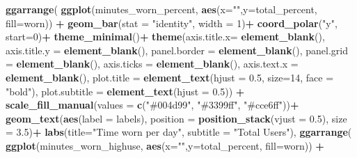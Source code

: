 \documentclass[
]{article}
\newenvironment{Shaded}{\begin{snugshade}}{\end{snugshade}}
\newcommand{\AttributeTok}[1]{\textcolor[rgb]{0.13,0.29,0.53}{#1}}
\newcommand{\DecValTok}[1]{\textcolor[rgb]{0.00,0.00,0.81}{#1}}
\newcommand{\FloatTok}[1]{\textcolor[rgb]{0.00,0.00,0.81}{#1}}
\newcommand{\FunctionTok}[1]{\textcolor[rgb]{0.13,0.29,0.53}{\textbf{#1}}}
\newcommand{\NormalTok}[1]{#1}
\newcommand{\SpecialCharTok}[1]{\textcolor[rgb]{0.81,0.36,0.00}{\textbf{#1}}}
\newcommand{\StringTok}[1]{\textcolor[rgb]{0.31,0.60,0.02}{#1}}
\begin{document}
\begin{Shaded}
\begin{Highlighting}[]
\FunctionTok{ggarrange}\NormalTok{(}
  \FunctionTok{ggplot}\NormalTok{(minutes\_worn\_percent, }\FunctionTok{aes}\NormalTok{(}\AttributeTok{x=}\StringTok{""}\NormalTok{,}\AttributeTok{y=}\NormalTok{total\_percent, }\AttributeTok{fill=}\NormalTok{worn)) }\SpecialCharTok{+}
  \FunctionTok{geom\_bar}\NormalTok{(}\AttributeTok{stat =} \StringTok{"identity"}\NormalTok{, }\AttributeTok{width =} \DecValTok{1}\NormalTok{)}\SpecialCharTok{+}
  \FunctionTok{coord\_polar}\NormalTok{(}\StringTok{"y"}\NormalTok{, }\AttributeTok{start=}\DecValTok{0}\NormalTok{)}\SpecialCharTok{+}
  \FunctionTok{theme\_minimal}\NormalTok{()}\SpecialCharTok{+}
  \FunctionTok{theme}\NormalTok{(}\AttributeTok{axis.title.x=} \FunctionTok{element\_blank}\NormalTok{(),}
        \AttributeTok{axis.title.y =} \FunctionTok{element\_blank}\NormalTok{(),}
        \AttributeTok{panel.border =} \FunctionTok{element\_blank}\NormalTok{(), }
        \AttributeTok{panel.grid =} \FunctionTok{element\_blank}\NormalTok{(), }
        \AttributeTok{axis.ticks =} \FunctionTok{element\_blank}\NormalTok{(),}
        \AttributeTok{axis.text.x =} \FunctionTok{element\_blank}\NormalTok{(),}
        \AttributeTok{plot.title =} \FunctionTok{element\_text}\NormalTok{(}\AttributeTok{hjust =} \FloatTok{0.5}\NormalTok{, }\AttributeTok{size=}\DecValTok{14}\NormalTok{, }\AttributeTok{face =} \StringTok{"bold"}\NormalTok{),}
        \AttributeTok{plot.subtitle =} \FunctionTok{element\_text}\NormalTok{(}\AttributeTok{hjust =} \FloatTok{0.5}\NormalTok{)) }\SpecialCharTok{+}
    \FunctionTok{scale\_fill\_manual}\NormalTok{(}\AttributeTok{values =} \FunctionTok{c}\NormalTok{(}\StringTok{"\#004d99"}\NormalTok{, }\StringTok{"\#3399ff"}\NormalTok{, }\StringTok{"\#cce6ff"}\NormalTok{))}\SpecialCharTok{+}
  \FunctionTok{geom\_text}\NormalTok{(}\FunctionTok{aes}\NormalTok{(}\AttributeTok{label =}\NormalTok{ labels),}
            \AttributeTok{position =} \FunctionTok{position\_stack}\NormalTok{(}\AttributeTok{vjust =} \FloatTok{0.5}\NormalTok{), }\AttributeTok{size =} \FloatTok{3.5}\NormalTok{)}\SpecialCharTok{+}
  \FunctionTok{labs}\NormalTok{(}\AttributeTok{title=}\StringTok{"Time worn per day"}\NormalTok{, }\AttributeTok{subtitle =} \StringTok{"Total Users"}\NormalTok{),}
  \FunctionTok{ggarrange}\NormalTok{(}
  \FunctionTok{ggplot}\NormalTok{(minutes\_worn\_highuse, }\FunctionTok{aes}\NormalTok{(}\AttributeTok{x=}\StringTok{""}\NormalTok{,}\AttributeTok{y=}\NormalTok{total\_percent, }\AttributeTok{fill=}\NormalTok{worn)) }\SpecialCharTok{+}

\end{Highlighting}
\end{Shaded}
\end{document}
